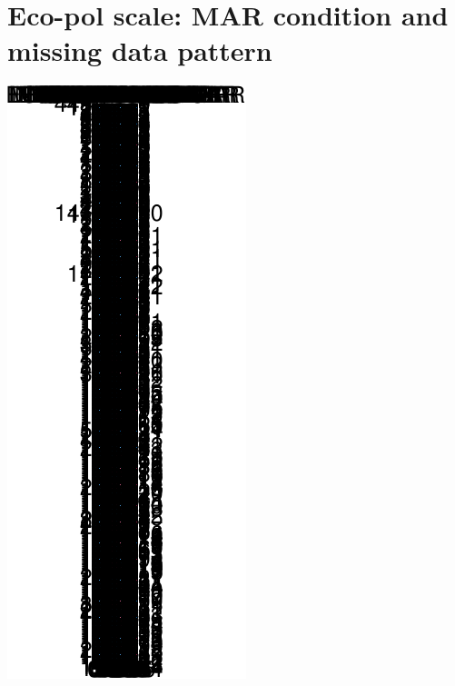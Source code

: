\documentclass[
]{article}
\begin{document}
\hypertarget{eco-pol-scale-mar-condition-and-missing-data-pattern}{%
\section{Eco-pol scale: MAR condition and missing data
pattern}\label{eco-pol-scale-mar-condition-and-missing-data-pattern}}

\includegraphics{withmice_files/figure-latex/unnamed-chunk-21-1.pdf}
\end{document}
